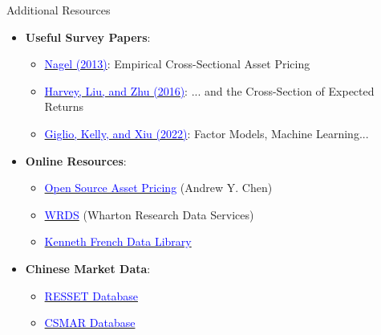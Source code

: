 \documentclass{beamer}
\begin{document}
\begin{frame}{Additional Resources}
	\begin{itemize}
		\item \textbf{Useful Survey Papers}:
		\begin{itemize}
			\item \href{https://doi.org/10.1146/annurev-financial-110112-120833}{\textcolor{blue}{Nagel (2013)}}: Empirical Cross-Sectional Asset Pricing
			\item \href{https://doi.org/10.1093/rfs/hhv059}{\textcolor{blue}{Harvey, Liu, and Zhu (2016)}}: ... and the Cross-Section of Expected Returns
			\item \href{https://doi.org/10.1146/annurev-financial-101521-104735}{\textcolor{blue}{Giglio, Kelly, and Xiu (2022)}}: Factor Models, Machine Learning...
		\end{itemize}
		\item \textbf{Online Resources}:
		\begin{itemize}
			\item \href{https://www.openassetpricing.com/}{\textcolor{blue}{Open Source Asset Pricing}} (Andrew Y. Chen)
			\item \href{https://wrds-www.wharton.upenn.edu/}{\textcolor{blue}{WRDS}} (Wharton Research Data Services)
			\item \href{https://mba.tuck.dartmouth.edu/pages/faculty/ken.french/data_library.html}{\textcolor{blue}{Kenneth French Data Library}}
		\end{itemize}
		\item \textbf{Chinese Market Data}:
		\begin{itemize}
			\item \href{https://www.resset.cn/}{\textcolor{blue}{RESSET Database}}
			\item \href{https://www.gtarsc.com/}{\textcolor{blue}{CSMAR Database}}
		\end{itemize}
	\end{itemize}
\end{frame}
\end{document}

